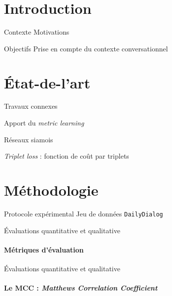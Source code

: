 \documentclass[11pt,aspectratio=169]{beamer}
\begin{document}
\section{Introduction}

\begin{frame}{Contexte}
    Motivations
\end{frame}

\begin{frame}{Objectifs}
    Prise en compte du contexte conversationnel
\end{frame}

\section{État-de-l'art}

\begin{frame}{Travaux connexes}
    
\end{frame}

\begin{frame}{Apport du \textsl{metric learning}}

\end{frame}

\begin{frame}{Réseaux siamois}
    
\end{frame}

\begin{frame}{\textsl{Triplet loss} : fonction de coût par triplets}
    
\end{frame}

\section{Méthodologie}

\begin{frame}{Protocole expérimental}
    Jeu de données \texttt{DailyDialog}~
\end{frame}

\begin{frame}{Évaluations quantitative et qualitative}
    \framesubtitle{Métriques d'évaluation}
    
\end{frame}

\begin{frame}{Évaluations quantitative et qualitative}
    \framesubtitle{Le MCC : \textsl{Matthews Correlation Coefficient}}
    
\end{frame}
\end{document}
